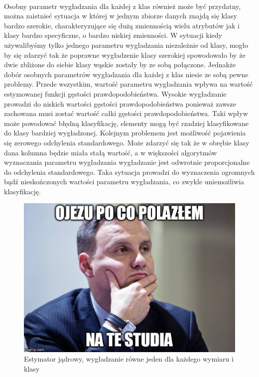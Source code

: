 \documentclass[a4paper,12pt,twoside]{article}
\begin{document}
\paragraph{}
Osobny parametr wygładzania dla każdej z klas również może być przydatny, można zaistnieć sytuacja w której w jednym zbiorze danych znajdą się klasy bardzo szerokie, charakteryzujące się dużą zmiennością wielu atrybutów jak i klasy bardzo specyficzne, o bardzo niskiej zmienności. W sytuacji kiedy używalibyśmy tylko jednego parametru wygładzania niezależnie od klasy, mogło by się zdarzyć tak że poprawne wygładzenie klasy szerokiej spowodowało by że dwie zbliżone do siebie klasy wąskie zostały by ze sobą połączone. Jednakże dobór osobnych parametrów wygładzania dla każdej z klas niesie ze sobą pewne problemy. Przede wszystkim, wartość parametru wygładzania wpływa na wartość estymowanej funkcji gęstości prawdopodobieństwa. Wysokie wygładzanie prowadzi do niskich wartości gęstości prawdopodobieństwa ponieważ zawsze zachowana musi zostać wartość całki gęstości prawdopodobieństwa. Taki wpływ może powodować błędną klasyfikację, elementy mogą być rzadziej klasyfikowane do klasy bardziej wygładzonej. Kolejnym problemem jest możliwość pojawienia się zerowego odchylenia standardowego. Może zdarzyć się tak że w obrębie klasy dana kolumna będzie miała stałą wartość, a w większości algorytmów wyznaczania parametru wygładzania wygładzanie jest odwrotnie proporcjonalne do odchylenia standardowego. Taka sytuacja prowadzi do wyznaczenia ogromnych bądź nieskończonych wartości parametru wygładzania, co zwykle uniemożliwia klasyfikację.
\newpage
\vfill 
\begin{figure}
    \centering
    \includegraphics[width=1.2\textwidth]{dudel.jpg}
    \caption{Estymator jądrowy, wygładzanie równe jeden dla każdego wymiaru i klasy}
\end{figure}
\end{document}

